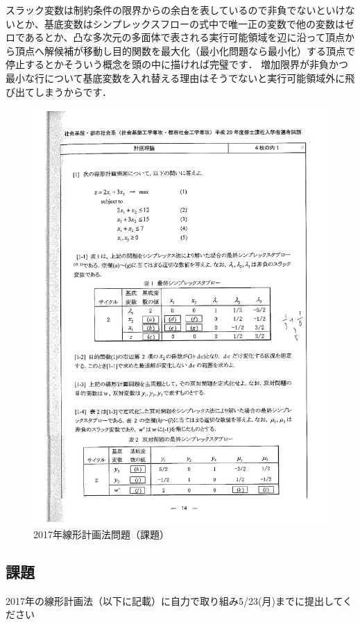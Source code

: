 \documentclass{jsarticle}
\begin{document}
スラック変数は制約条件の限界からの余白を表しているので非負でないといけないとか、基底変数はシンプレックスフローの式中で唯一正の変数で他の変数はゼロであるとか、凸な多次元の多面体で表される実行可能領域を辺に沿って頂点から頂点へ解候補が移動し目的関数を最大化（最小化問題なら最小化）する頂点で停止するとかそういう概念を頭の中に描ければ完璧です．
増加限界が非負かつ最小な行について基底変数を入れ替える理由はそうでないと実行可能領域外に飛び出てしまうからです．

\begin{figure}[htbp]
  \includegraphics[keepaspectratio, width=16cm]{figures/liner2017.png}
  \caption{2017年線形計画法問題（課題）}
\end{figure}

\subsection{課題}
2017年の線形計画法（以下に記載）に自力で取り組み5/23(月)までに提出してください
\end{document}
